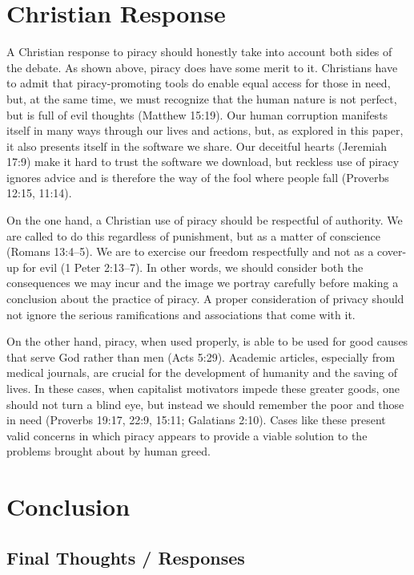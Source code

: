 \documentclass[onecolumn, 12pt]{article}
\begin{document}
\section{Christian Response}
A Christian response to piracy should honestly take into account both sides of
the debate. As shown above, piracy does have some merit to it. Christians have
to admit that piracy-promoting tools do enable equal access for those in need,
but, at the same time, we must recognize that the human nature is not perfect,
but is full of evil thoughts (Matthew 15:19). Our human corruption manifests
itself in many ways through our lives and actions, but, as explored in this
paper, it also presents itself in the software we share. Our deceitful hearts
(Jeremiah 17:9) make it hard to trust the software we download, but reckless
use of piracy ignores advice and is therefore the way of the fool where people
fall (Proverbs 12:15, 11:14).

On the one hand, a Christian use of piracy should be respectful of authority.
We are called to do this regardless of punishment, but as a matter of
conscience (Romans 13:4--5). We are to exercise our freedom respectfully and
not as a cover-up for evil (1 Peter 2:13--7). In other words, we should consider
both the consequences we may incur and the image we portray carefully before
making a conclusion about the practice of piracy. A proper consideration of
privacy should not ignore the serious ramifications and associations that come
with it.

On the other hand, piracy, when used properly, is able to be used for good
causes that serve God rather than men (Acts 5:29). Academic articles,
especially from medical journals, are crucial for the development of humanity
and the saving of lives. In these cases, when capitalist motivators impede these
greater goods, one should not turn a blind eye, but instead we should remember
the poor and those in need (Proverbs 19:17, 22:9, 15:11; Galatians 2:10). Cases
like these present valid concerns in which piracy appears to provide a viable
solution to the problems brought about by human greed.

\section{Conclusion}

\subsection{Final Thoughts / Responses}
\end{document}
